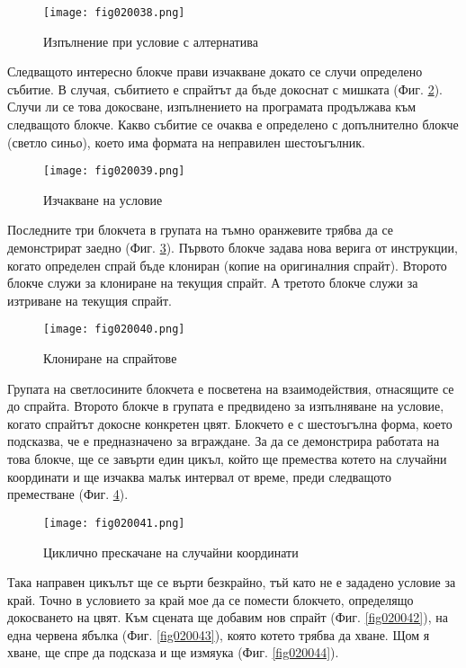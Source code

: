 \begin{figure}[H]
  \centering
  \texttt{[image: fig020038.png]}
  \caption{Изпълнение при условие с алтернатива}
\label{fig020038}
\end{figure}

Следващото интересно блокче прави изчакване докато се случи определено събитие. В случая, събитието е спрайтът да бъде докоснат с мишката (Фиг. \ref{fig020039}). Случи ли се това докосване, изпълнението на програмата продължава към следващото блокче. Какво събитие се очаква е определено с допълнително блокче (светло синьо), което има формата на неправилен шестоъгълник.

\begin{figure}[H]
  \centering
  \texttt{[image: fig020039.png]}
  \caption{Изчакване на условие}
\label{fig020039}
\end{figure}

Последните три блокчета в групата на тъмно оранжевите трябва да се демонстрират заедно (Фиг. \ref{fig020040}). Първото блокче задава нова верига от инструкции, когато определен спрай бъде клониран (копие на оригиналния спрайт). Второто блокче служи за клониране на текущия спрайт. А третото блокче служи за изтриване на текущия спрайт. 

\begin{figure}[H]
  \centering
  \texttt{[image: fig020040.png]}
  \caption{Клониране на спрайтове}
\label{fig020040}
\end{figure}

Групата на светлосините блокчета е посветена на взаимодействия, отнасящите се до спрайта. Второто блокче в групата е предвидено за изпълняване на условие, когато спрайтът докосне конкретен цвят. Блокчето е с шестоъгълна форма, което подсказва, че е предназначено за вграждане. За да се демонстрира работата на това блокче, ще се завърти един цикъл, който ще премества котето на случайни координати и ще изчаква малък интервал от време, преди следващото преместване (Фиг. \ref{fig020041}). 

\begin{figure}[H]
  \centering
  \texttt{[image: fig020041.png]}
  \caption{Циклично прескачане на случайни координати}
\label{fig020041}
\end{figure}

Така направен цикълът ще се върти безкрайно, тъй като не е зададено условие за край. Точно в условието за край мое да се помести блокчето, определящо докосването на цвят. Към сцената ще добавим нов спрайт (Фиг. \ref{fig020042}), на една червена ябълка (Фиг. \ref{fig020043}), която котето трябва да хване. Щом я хване, ще спре да подсказа и ще измяука (Фиг. \ref{fig020044}). 

